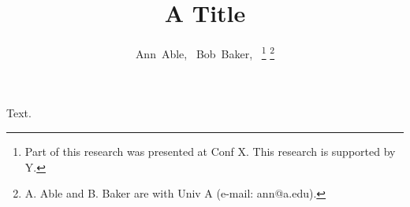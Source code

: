 \documentclass[journal]{IEEEtran}
\begin{document}
\title{A Title}
\author{Ann~Able,~
        Bob~Baker,~
\thanks{Part of this research was presented at Conf X. This research is supported by Y.}%
\thanks{A. Able and B. Baker are with Univ A (e-mail: ann@a.edu).}}
\maketitle
Text.
\end{document}
